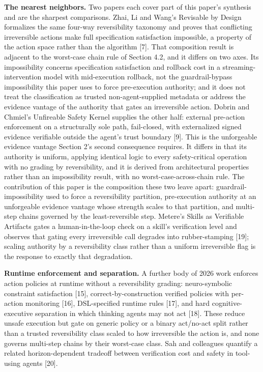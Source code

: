 \documentclass[
  11pt,
]{article}
\begin{document}
\textbf{The nearest neighbors.} Two papers each cover part of this
paper's synthesis and are the sharpest comparisons. Zhai, Li and Wang's
Revisable by Design formalizes the same four-way reversibility taxonomy
and proves that conflicting irreversible actions make full specification
satisfaction impossible, a property of the action space rather than the
algorithm {[}7{]}. That composition result is adjacent to the worst-case
chain rule of Section 4.2, and it differs on two axes. Its impossibility
concerns specification satisfaction and rollback cost in a
streaming-intervention model with mid-execution rollback, not the
guardrail-bypass impossibility this paper uses to force pre-execution
authority; and it does not treat the classification as trusted
non-agent-supplied metadata or address the evidence vantage of the
authority that gates an irreversible action. Dobrin and Chmiel's
Unfireable Safety Kernel supplies the other half: external pre-action
enforcement on a structurally sole path, fail-closed, with externalized
signed evidence verifiable outside the agent's trust boundary {[}9{]}.
This is the unforgeable evidence vantage Section 2's second consequence
requires. It differs in that its authority is uniform, applying
identical logic to every safety-critical operation with no grading by
reversibility, and it is derived from architectural properties rather
than an impossibility result, with no worst-case-across-chain rule. The
contribution of this paper is the composition these two leave apart:
guardrail-impossibility used to force a reversibility partition,
pre-execution authority at an unforgeable evidence vantage whose
strength scales to that partition, and multi-step chains governed by the
least-reversible step. Metere's Skills as Verifiable Artifacts gates a
human-in-the-loop check on a skill's verification level and observes
that gating every irreversible call degrades into rubber-stamping
{[}19{]}; scaling authority by a reversibility class rather than a
uniform irreversible flag is the response to exactly that degradation.

\textbf{Runtime enforcement and separation.} A further body of 2026 work
enforces action policies at runtime without a reversibility grading:
neuro-symbolic constraint satisfaction {[}15{]}, correct-by-construction
verified policies with per-action monitoring {[}16{]}, DSL-specified
runtime rules {[}17{]}, and hard cognitive-executive separation in which
thinking agents may not act {[}18{]}. These reduce unsafe execution but
gate on generic policy or a binary act/no-act split rather than a
trusted reversibility class scaled to how irreversible the action is,
and none governs multi-step chains by their worst-case class. Sah and
colleagues quantify a related horizon-dependent tradeoff between
verification cost and safety in tool-using agents {[}20{]}.
\end{document}
